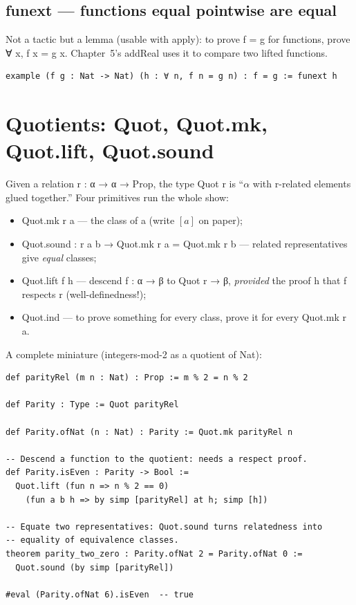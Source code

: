 \documentclass[12pt, openany]{book}
\theoremstyle{plain}
\theoremstyle{definition}
\theoremstyle{remark}
\newcommand{\li}[1]{{\ttfamily\small\color{tealaccent}#1}}
\begin{document}
\subsection*{\li{funext} --- functions equal pointwise are equal}

Not a tactic but a lemma (usable with \li{apply}): to prove \li{f = g} for functions, prove \li{∀ x, f x = g x}.  Chapter~5's \li{addReal} uses it to compare two lifted functions.

\begin{leanbox}
\begin{lstlisting}
example (f g : Nat -> Nat) (h : ∀ n, f n = g n) : f = g := funext h
\end{lstlisting}
\end{leanbox}
\color{black}

\section{Quotients: \li{Quot}, \li{Quot.mk}, \li{Quot.lift}, \li{Quot.sound}}

Given a relation \li{r : α → α → Prop}, the type \li{Quot r} is ``$\alpha$ with \li{r}-related elements glued together.''  Four primitives run the whole show:

\begin{itemize}[noitemsep]
  \item \li{Quot.mk r a} --- the class of \li{a} (write $[a]$ on paper);
  \item \li{Quot.sound : r a b → Quot.mk r a = Quot.mk r b} --- related representatives give \emph{equal} classes;
  \item \li{Quot.lift f h} --- descend \li{f : α → β} to \li{Quot r → β}, \emph{provided} the proof \li{h} that \li{f} respects \li{r} (well-definedness!);
  \item \li{Quot.ind} --- to prove something for every class, prove it for every \li{Quot.mk r a}.
\end{itemize}

A complete miniature (integers-mod-2 as a quotient of \li{Nat}):

\begin{leanbox}
\begin{lstlisting}
def parityRel (m n : Nat) : Prop := m % 2 = n % 2

def Parity : Type := Quot parityRel

def Parity.ofNat (n : Nat) : Parity := Quot.mk parityRel n

-- Descend a function to the quotient: needs a respect proof.
def Parity.isEven : Parity -> Bool :=
  Quot.lift (fun n => n % 2 == 0)
    (fun a b h => by simp [parityRel] at h; simp [h])

-- Equate two representatives: Quot.sound turns relatedness into
-- equality of equivalence classes.
theorem parity_two_zero : Parity.ofNat 2 = Parity.ofNat 0 :=
  Quot.sound (by simp [parityRel])

#eval (Parity.ofNat 6).isEven  -- true
\end{lstlisting}
\end{leanbox}
\color{black}
\end{document}
